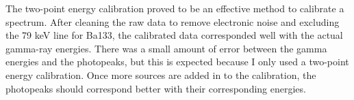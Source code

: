 The two-point energy calibration proved to be an effective method to calibrate a
spectrum. After cleaning the raw data to remove electronic noise and excluding
the 79 keV line for Ba133, the calibrated data corresponded well with the actual
gamma-ray energies. There was a small amount of error between the gamma energies
and the photopeaks, but this is expected because I only used a two-point
energy calibration. Once more sources are added in to the calibration, the photopeaks
should correspond better with their corresponding energies. 
